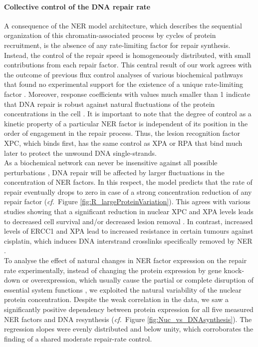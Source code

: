 \paragraph{Collective control of the DNA repair rate}
A consequence of the NER model architecture, which describes the sequential organization of this chromatin-associated process by cycles of protein recruitment, is the absence of any rate-limiting factor for repair synthesis. Instead, the control of the repair speed is homogeneously distributed, with small contributions from each repair factor. This central result of our work agrees with the outcome of previous flux control analyses of various biochemical pathways that found no experimental support for the existence of a unique rate-limiting factor \cite{Fell1992,Bruggeman2007,Yi2000a}. Moreover, response coefficients with values much smaller than 1 indicate that DNA repair is robust  against natural fluctuations of the protein concentrations in the cell \cite{Bluthgen2013}. It is important to note that the degree of control as a kinetic property of a particular NER factor is independent of its position in the order of engagement in the repair process. Thus, the lesion recognition factor XPC, which binds first, has the same control as XPA or RPA that bind much later to protect the unwound DNA single-strands.\\
As a biochemical network can never be insensitive against all possible perturbations \cite{Bluthgen2013,Csete2002}, DNA repair will be affected by larger fluctuations in the concentration of NER factors. In this respect, the model predicts that the rate of repair eventually drops to zero in case of a strong concentration reduction of any repair factor (\textit{cf.}\ Figure \ref{fig:R_largeProteinVariation}). This agrees with various studies showing that a significant reduction in nuclear XPC and XPA levels leads to decreased cell survival and/or decreased lesion removal \cite{Koberle1999,Koberle2006,Renaud2011}. In contrast, increased levels of ERCC1 and XPA lead to increased resistance in certain tumours against cisplatin, which induces DNA interstrand crosslinks specifically removed by NER \cite{Koberle1999,Koberle2006,Renaud2011,Stewart2007,Arora2010}.   
\\ 
To analyse the effect of natural changes in NER factor expression on the repair rate experimentally, instead of changing the protein expression by gene knock-down or overexpression, which usually cause the partial or complete disruption of essential system functions \cite{Moriya2006}, we exploited the natural variability of the nuclear protein concentration. Despite the weak correlation in the data, we saw a significantly positive dependency between protein expression for all five measured NER factors and DNA resynthesis (\textit{cf.}\ Figure \ref{fig:Nuc_vs_DNAsynthesis}). The regression slopes were evenly distributed and below unity, which corroborates the finding of a shared moderate repair-rate control.\\  
